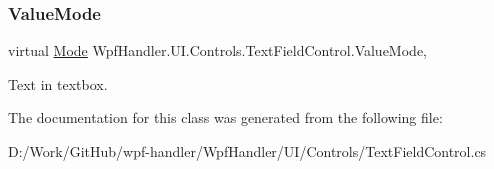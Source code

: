\subsubsection{\texorpdfstring{Value\+Mode}{ValueMode}}
{\footnotesize\ttfamily virtual \mbox{\hyperlink{class_wpf_handler_1_1_u_i_1_1_controls_1_1_text_field_control_a99939f3d8500812661376afa5ee1a31d}{Mode}} Wpf\+Handler.\+U\+I.\+Controls.\+Text\+Field\+Control.\+Value\+Mode\hspace{0.3cm}{\ttfamily [get]}, {\ttfamily [set]}}



Text in textbox. 



The documentation for this class was generated from the following file\+:\begin{DoxyCompactItemize}
\item 
D\+:/\+Work/\+Git\+Hub/wpf-\/handler/\+Wpf\+Handler/\+U\+I/\+Controls/Text\+Field\+Control.\+cs\end{DoxyCompactItemize}

